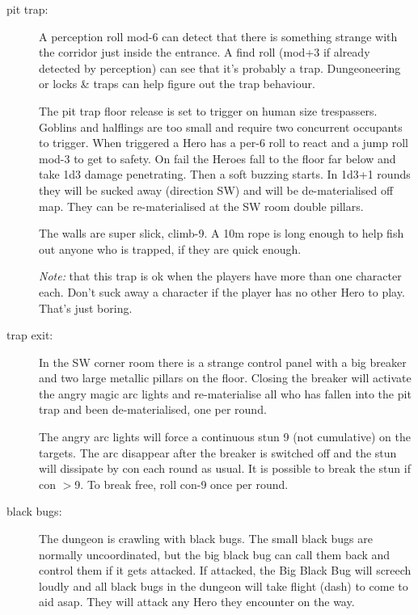 \begin{description}

\item[pit trap:] A perception roll mod-6 can detect that there is something strange with the corridor just inside the entrance. A find roll (mod+3 if already detected by perception) can see that it's probably a trap. Dungeoneering or locks \& traps can help figure out the trap behaviour.

The pit trap floor release is set to trigger on human size trespassers. Goblins and halflings are too small and require two concurrent occupants to trigger. When triggered a Hero has a per-6 roll to react and a jump roll mod-3 to get to safety. On fail the Heroes fall to the floor far below and take 1d3 damage penetrating. Then a soft buzzing starts. In 1d3+1 rounds they will be sucked away (direction SW) and will be de-materialised off map. They can be re-materialised at the SW room double pillars.

The walls are super slick, climb-9. A 10m rope is long enough to help fish out anyone who is trapped, if they are quick enough.

\emph{Note:} that this trap is ok when the players have more than one character each. Don't suck away a character if the player has no other Hero to play. That's just boring.

\item[trap exit:] In the SW corner room there is a strange control panel with a big breaker and two large metallic pillars on the floor. Closing the breaker will activate the angry magic arc lights and re-materialise all who has fallen into the pit trap and been de-materialised, one per round.

The angry arc lights will force a continuous stun 9 (not cumulative) on the targets. The arc disappear after the breaker is switched off and the stun will dissipate by con each round as usual. It is possible to break the stun if con $>$9. To break free, roll con-9 once per round.

\item[black bugs:] The dungeon is crawling with black bugs. The small black bugs are normally uncoordinated, but the big black bug can call them back and control them if it gets attacked. If attacked, the Big Black Bug will screech loudly and all black bugs in the dungeon will take flight (dash) to come to aid asap. They will attack any Hero they encounter on the way.


\end{description}
